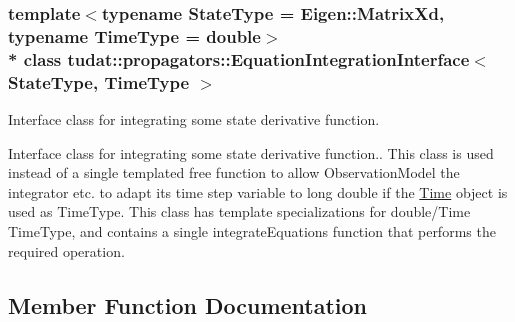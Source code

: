 \subsubsection*{template$<$typename State\+Type = Eigen\+::\+Matrix\+Xd, typename Time\+Type = double$>$\\*
class tudat\+::propagators\+::\+Equation\+Integration\+Interface$<$ State\+Type, Time\+Type $>$}

Interface class for integrating some state derivative function. 

Interface class for integrating some state derivative function.. This class is used instead of a single templated free function to allow Observation\+Model the integrator etc. to adapt its time step variable to long double if the \hyperlink{classtudat_1_1Time}{Time} object is used as Time\+Type. This class has template specializations for double/\+Time Time\+Type, and contains a single integrate\+Equations function that performs the required operation. 

\subsection{Member Function Documentation}
